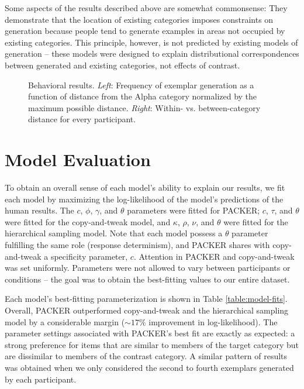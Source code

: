 \documentclass[10pt,letterpaper]{article}
\newcommand\inputpgf[2]{{
\let\pgfimageWithoutPath\pgfimage
\renewcommand{\pgfimage}[2][]{\pgfimageWithoutPath[##1]{#1/##2}}

}}
\begin{document}
Some aspects of the results described above are somewhat commonsense: They demonstrate that the location of existing categories imposes constraints on generation because people tend to generate examples in areas not occupied by existing categories. This principle, however, is not predicted by existing models of generation -- these models were designed to explain distributional correspondences between generated and existing categories, not effects of contrast.  

\begin{figure}
    \begin{center}
    \inputpgf{figs/}{distance.figs.pgf}
    \caption{Behavioral results. \textit{Left}: Frequency of exemplar generation as a function of distance from the Alpha category normalized by the maximum possible distance. \textit{Right}: Within- vs. between-category distance for every participant. }
    \label{fig:distance.figs}
    \end{center}
\end{figure}


\section{Model Evaluation}
To obtain an overall sense of each model's ability to explain our results, we fit each model by maximizing the log-likelihood of the model's predictions of the human results. The $c$, $\phi$, $\gamma$, and $\theta$ parameters were fitted for PACKER; $c$, $\tau$, and $\theta$ were fitted for the copy-and-tweak model, and $\kappa$, $\rho$, $\nu$, and $\theta$ were fitted for the hierarchical sampling model. Note that each model possess a $\theta$ parameter fulfilling the same role (response determinism), and PACKER shares with copy-and-tweak a specificity parameter, $c$. Attention in PACKER and copy-and-tweak was set uniformly. Parameters were not allowed to vary between participants or conditions -- the goal was to obtain the best-fitting values to our entire dataset.

Each model's best-fitting parameterization is shown in Table \ref{table:model-fits}. Overall, PACKER outperformed copy-and-tweak and the hierarchical sampling model by a considerable margin ($\sim17\%$ improvement in log-likelihood). The parameter settings associated with PACKER's best fit are exactly as expected: a strong preference for items that are similar to members of the target category but are dissimilar to members of the contrast category. A similar pattern of results was obtained when we only considered the second to fourth exemplars generated by each participant.
\end{document}
